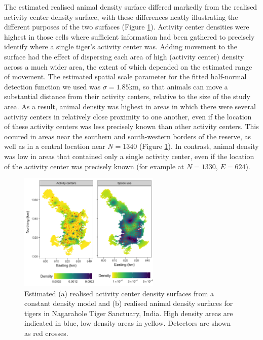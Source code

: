 \documentclass[a4paper,12pt]{article}
\begin{document}
The estimated realised animal density surface differed markedly from the realised activity center density surface, with these differences neatly illustrating the different purposes of the two surfaces (Figure \ref{tigerspaceuse}). Activity center densities were highest in those cells where sufficient information had been gathered to precisely identify where a single tiger's activity center was. Adding movement to the surface had the effect of dispersing each area of high (activity center) density across a much wider area, the extent of which depended on the estimated range of movement. The estimated spatial scale parameter for the fitted half-normal detection function we used was $\sigma=1.85$km, so that animals can move a substantial distance from their activity centers, relative to the size of the study area. As a result, animal density was highest in areas in which there were several activity centers in relatively close proximity to one another, even if the location of these activity centers was less precisely known than other activity centers. This occured in areas near the southern and south-western borders of the reserve, as well as in a central location near $N=1340$ (Figure \ref{tigerspaceuse}). In contrast, animal density was low in areas that contained only a single activity center, even if the location of the activity center was precisely known (for example at $N=1330$, $E=624$).

\begin{figure}[htbp]
\centering
\includegraphics[width=0.6\textwidth]{tiger_spaceuse.png}
\caption{Estimated (a) realised activity center density surfaces from a constant density model and (b) realised animal density surfaces for tigers in Nagarahole Tiger Sanctuary, India. High density areas are indicated in blue, low density areas in yellow. Detectors are shown as red crosses.}
\label{tigerspaceuse}
\end{figure}
\end{document}
